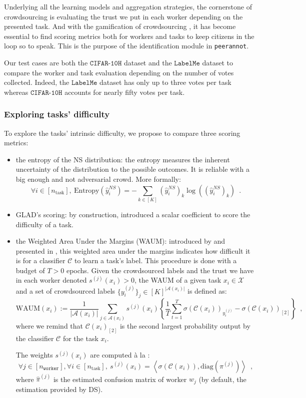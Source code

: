 Underlying all the learning models and aggregation strategies, the cornerstone of crowdsourcing is evaluating the trust we put in each worker depending on the presented task. And with the gamification of crowdsourcing \citep{plantgame2016,tinati2017investigation}, it has become essential to find scoring metrics both for workers and tasks to keep citizens in the loop so to speak.
This is the purpose of the identification module in \texttt{peerannot}.

Our test cases are both the $\texttt{CIFAR-10H}$ dataset and the $\texttt{LabelMe}$ dataset to compare the worker and task evaluation depending on the number of votes collected.
Indeed, the $\texttt{LabelMe}$ dataset has only up to three votes per task whereas $\texttt{CIFAR-10H}$ accounts for nearly fifty votes per task.

\subsubsection{Exploring tasks' difficulty}
To explore the tasks' intrinsic difficulty, we propose to compare three scoring metrics:

\begin{itemize}
    \item the entropy of the NS distribution: the entropy measures the inherent uncertainty of the distribution to the possible outcomes. It is reliable with a big enough and not adversarial crowd. More formally:
    $$
    \forall i\in [n_{\text{task}}],\ \mathrm{Entropy}(\hat{y}_i^{NS}) = -\sum_{k\in[K]} (\hat{y}_i^{NS})_k \log\left((\hat{y}_i^{NS})_k\right) \enspace.
    $$
    \item GLAD's scoring: by construction, \citet{whitehill_whose_2009} introduced a scalar coefficient to score the difficulty of a task.
    \item the Weighted Area Under the Margins (WAUM): introduced by \citet{lefort2022improve} and presented in , this weighted area under the margins indicates how difficult it is for a classifier $\mathcal{C}$ to learn a task's label. This procedure is done with a budget of $T>0$ epochs. Given the crowdsourced labels and the trust we have in each worker denoted $s^{(j)}(x_i)>0$, the WAUM of a given task $x_i\in\mathcal{X}$ and a set of crowdsourced labels $\{y_i^{(j)}\}_j \in [K]^{|\mathcal{A}(x_i)|}$ is defined as:
    $$\mathrm{WAUM}(x_i) := \frac{1}{|\mathcal{A}(x_i)|}\sum_{j\in\mathcal{A}(x_i)} s^{(j)}(x_i)\left\{\frac{1}{T}\sum_{t=1}^T  \sigma(\mathcal{C}(x_i))_{y_i^{(j)}} - \sigma(\mathcal{C}(x_i))_{[2]}\right\} \enspace,
    $$
    where we remind that $\mathcal{C}(x_i)_{[2]}$ is the second largest probability output by the classifier $\mathcal{C}$ for the task $x_i$.

    The weights $s^{(j)}(x_i)$ are computed à la \citet{servajean2017crowdsourcing}:
    $$
    \forall j\in[n_\texttt{worker}], \forall i\in[n_{\text{task}}],\ s^{(j)}(x_i) = \left\langle \sigma(\mathcal{C}(x_i)), \mathrm{diag}(\pi^{(j)})\right\rangle \enspace,
    $$
    where $\hat{\pi}^{(j)}$ is the estimated confusion matrix of worker $w_j$ (by default, the estimation provided by DS).
\end{itemize}

